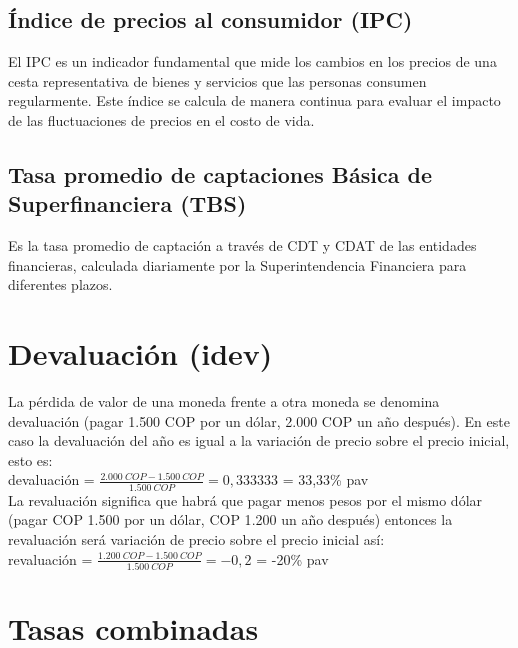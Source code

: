 \subsection{Índice de precios al consumidor (IPC)}
El IPC es un indicador fundamental que mide los cambios en los precios de una cesta representativa de bienes y servicios que las personas consumen regularmente. Este índice se calcula de manera continua para evaluar el impacto de las fluctuaciones de precios en el costo de vida.


\subsection{Tasa promedio de captaciones Básica de Superfinanciera (TBS)}
Es la tasa promedio de captación a través de CDT y CDAT de las entidades financieras, calculada diariamente por la Superintendencia Financiera para diferentes plazos.

\section{Devaluación (idev)}
La pérdida de valor de una moneda frente a otra moneda se denomina devaluación (pagar  1{.}500 COP por un dólar,  2{.}000 COP un año después). En este caso la devaluación del año es igual a la variación de precio sobre el precio inicial, esto es: \\

devaluación = $\frac{ 2{.}000 \ COP - 1{.}500 \ COP}{ 1{.}500 \ COP} = 0,333333 $ = 33,33\% pav \\

La revaluación significa que habrá que pagar menos pesos por el mismo dólar (pagar  COP 1{.}500 por un dólar,  COP 1{.}200 un año después) entonces la revaluación será variación de precio sobre el precio inicial así: \\

revaluación = $\frac{ 1{.}200 \ COP - 1{.}500 \ COP}{ 1{.}500 \ COP} = -0,2$ = -20\% pav \\
 \newline




\section{Tasas combinadas}

